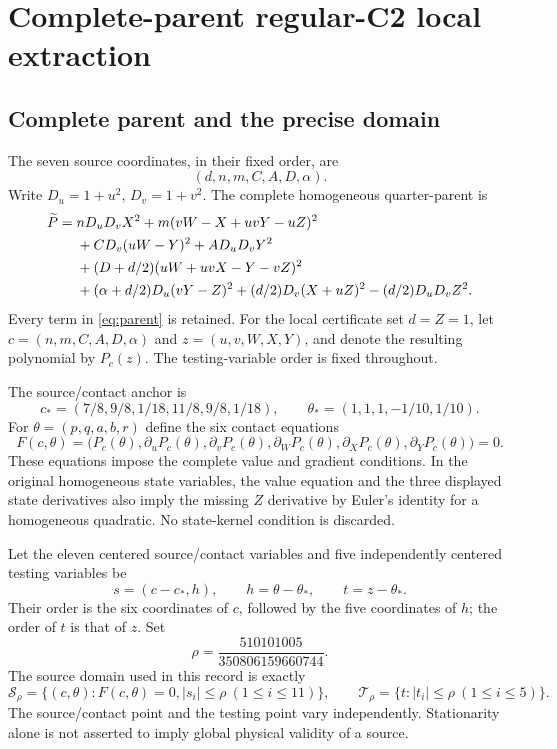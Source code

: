 \section{Complete-parent regular-C2 local extraction}
\subsection{Complete parent and the precise domain}

The seven source coordinates, in their fixed order, are
\[
  (d,n,m,C,A,D,\alpha).
\]
Write $D_u=1+u^2$, $D_v=1+v^2$. The complete homogeneous quarter-parent is
\begin{align}
\widetilde P={}&nD_uD_vX^2
 +m(vW-X+uvY-uZ)^2\notag\\
 &+CD_v(uW-Y)^2+AD_uD_vY^2\notag\\
 &+(D+d/2)(uW+uvX-Y-vZ)^2\notag\\
 &+(\alpha+d/2)D_u(vY-Z)^2
 +(d/2)D_v(X+uZ)^2-(d/2)D_uD_vZ^2.
 \label{eq:parent}
\end{align}
Every term in \eqref{eq:parent} is retained. For the local certificate set
$d=Z=1$, let $c=(n,m,C,A,D,\alpha)$ and $z=(u,v,W,X,Y)$, and denote the resulting
polynomial by $P_c(z)$. The testing-variable order is fixed throughout.

The source/contact anchor is
\begin{equation}
 c_*=(7/8,9/8,1/18,11/8,9/8,1/18),\qquad
 \theta_*=(1,1,1,-1/10,1/10).
 \label{eq:anchor}
\end{equation}
For $\theta=(p,q,a,b,r)$ define the six contact equations
\begin{equation}
  F(c,\theta)=\bigl(P_c(\theta),\partial_uP_c(\theta),
  \partial_vP_c(\theta),\partial_WP_c(\theta),
  \partial_XP_c(\theta),\partial_YP_c(\theta)\bigr)=0.
  \label{eq:contact}
\end{equation}
These equations impose the complete value and gradient conditions. In the
original homogeneous state variables, the value equation and the three
displayed state derivatives also imply the missing $Z$ derivative by Euler's
identity for a homogeneous quadratic. No state-kernel condition is discarded.

Let the eleven centered source/contact variables and five independently
centered testing variables be
\begin{equation}
 s=(c-c_*,h),\qquad h=\theta-\theta_*,\qquad
 t=z-\theta_*.
 \label{eq:center}
\end{equation}
Their order is the six coordinates of $c$, followed by the five coordinates
of $h$; the order of $t$ is that of $z$. Set
\begin{equation}
 \rho=\frac{510101005}{350806159660744}.
 \label{eq:rho}
\end{equation}
The source domain used in this record is exactly
\begin{equation}
 \mathcal S_\rho=\{(c,\theta):F(c,\theta)=0, |s_i|\leq\rho
 \ (1\leq i\leq11)\},
 \qquad
 \mathcal T_\rho=\{t:|t_i|\leq\rho\ (1\leq i\leq5)\}.
 \label{eq:domain}
\end{equation}
The source/contact point and the testing point vary independently. Stationarity
alone is not asserted to imply global physical validity of a source.

